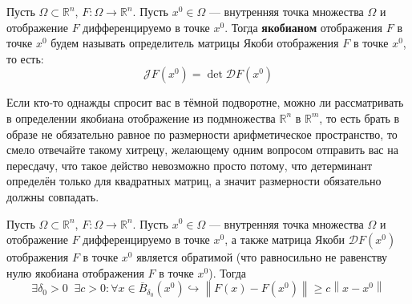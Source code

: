 \documentclass[11pt]{article}
\begin{document}
\begin{definition}
    Пусть $\Omega \subset \mathbb{R}^n$, $F \colon \Omega \to \mathbb{R}^n$. Пусть $x^0 \in \Omega$ --- внутренняя точка множества $\Omega$ и отображение $F$ дифференцируемо в точке $x^0$. Тогда \textbf{якобианом} отображения $F$ в точке $x^0$ будем называть 
    определитель матрицы Якоби отображения $F$ в точке $x^0$, то есть:
    \[\mathcal{J} F\left(x^0\right) = \det \mathcal{D} F\left(x^0\right)\]
\end{definition}

\begin{remark}
    Если кто-то однажды спросит вас в тёмной подворотне, можно ли рассматривать в определении якобиана отображение из подмножества $\mathbb{R}^n$ в $\mathbb{R}^m$, то есть брать в образе не обязательно равное по размерности арифметическое пространство,
    то смело отвечайте такому хитрецу, желающему одним вопросом отправить вас на пересдачу, что такое действо невозможно просто потому, что детерминант определён только для квадратных матриц, а значит размерности обязательно должны совпадать.
\end{remark}

\begin{theorem}
    Пусть $\Omega \subset \mathbb{R}^n$, $F \colon \Omega \to \mathbb{R}^n$. Пусть $x^0 \in \Omega$ --- внутренняя точка множества $\Omega$ и отображение $F$ дифференцируемо в точке $x^0$, а также матрица Якоби $\mathcal{D} F\left(x^0\right)$ отображения $F$ в точке $x^0$ является обратимой (что равносильно не равенству нулю якобиана отображения $F$ в точке $x^0$). Тогда
    \[\exists \delta_0 > 0 \; \; \exists c > 0: \forall x \in \overline{B}_{\delta_0}\left(x^0\right) \hookrightarrow \left\lVert F\left(x\right) - F\left(x^0\right) \right\rVert \geq c \left\lVert x - x^0 \right\rVert\] 
\end{theorem}
\end{document}
